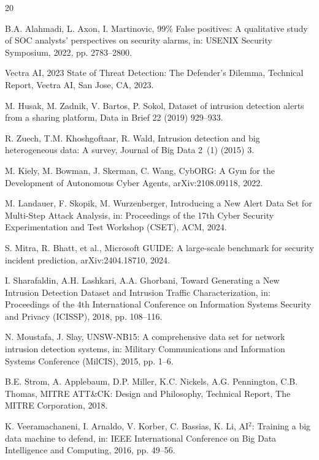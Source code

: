 \documentclass[review]{elsarticle}
\begin{document}
\begin{thebibliography}{20}

B.A. Alahmadi, L. Axon, I. Martinovic, 99\% False positives: A qualitative study of SOC analysts' perspectives on security alarms, in: USENIX Security Symposium, 2022, pp. 2783--2800.

Vectra AI, 2023 State of Threat Detection: The Defender's Dilemma, Technical Report, Vectra AI, San Jose, CA, 2023.

M. Husak, M. Zadnik, V. Bartos, P. Sokol, Dataset of intrusion detection alerts from a sharing platform, Data in Brief 22 (2019) 929--933.

R. Zuech, T.M. Khoshgoftaar, R. Wald, Intrusion detection and big heterogeneous data: A survey, Journal of Big Data 2~(1) (2015) 3.

M. Kiely, M. Bowman, J. Skerman, C. Wang, CybORG: A Gym for the Development of Autonomous Cyber Agents, arXiv:2108.09118, 2022.

M. Landauer, F. Skopik, M. Wurzenberger, Introducing a New Alert Data Set for Multi-Step Attack Analysis, in: Proceedings of the 17th Cyber Security Experimentation and Test Workshop (CSET), ACM, 2024.

S. Mitra, R. Bhatt, et al., Microsoft GUIDE: A large-scale benchmark for security incident prediction, arXiv:2404.18710, 2024.

I. Sharafaldin, A.H. Lashkari, A.A. Ghorbani, Toward Generating a New Intrusion Detection Dataset and Intrusion Traffic Characterization, in: Proceedings of the 4th International Conference on Information Systems Security and Privacy (ICISSP), 2018, pp. 108--116.

N. Moustafa, J. Slay, UNSW-NB15: A comprehensive data set for network intrusion detection systems, in: Military Communications and Information Systems Conference (MilCIS), 2015, pp. 1--6.

B.E. Strom, A. Applebaum, D.P. Miller, K.C. Nickels, A.G. Pennington, C.B. Thomas, MITRE ATT\&CK: Design and Philosophy, Technical Report, The MITRE Corporation, 2018.

K. Veeramachaneni, I. Arnaldo, V. Korber, C. Bassias, K. Li, AI$^2$: Training a big data machine to defend, in: IEEE International Conference on Big Data Intelligence and Computing, 2016, pp. 49--56.


\end{thebibliography}
\end{document}
